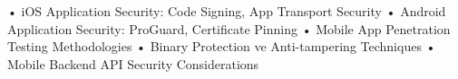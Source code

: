 • iOS Application Security: Code Signing, App Transport Security
• Android Application Security: ProGuard, Certificate Pinning
• Mobile App Penetration Testing Methodologies
• Binary Protection ve Anti-tampering Techniques
• Mobile Backend API Security Considerations